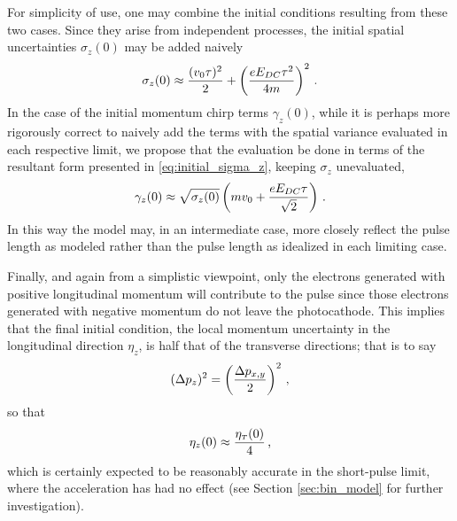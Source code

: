 For simplicity of use, one may combine the initial conditions resulting from these two cases.
Since they arise from independent processes, the initial spatial uncertainties $\sigma_{ z } ( 0 )$ may be added naively 
\begin{equation} \label{eq:initial_sigma_z}
  \sigma_{ z } ( 0 ) \approx \frac{ ( v_{ 0 } \tau )^{ 2 } }{ 2 } + \left ( \frac{ e E_{ DC } \tau^{ 2 } }{ 4 m } \right )^{ 2 } \, \text{.}
\end{equation}
In the case of the initial momentum chirp terms $\gamma_{ z } ( 0 )$, while it is perhaps more rigorously correct to naively add  the terms with the spatial variance evaluated in each respective limit, we propose that the evaluation be done in terms of the resultant form presented in \ref{eq:initial_sigma_z}, keeping $\sigma_{z}$ unevaluated, 
\begin{equation}
  \gamma_{ z } ( 0 ) \approx \sqrt{ \sigma_{ z } ( 0 ) } \left ( m v_{ 0 } + \frac{ e E_{DC} \tau }{ \sqrt{ 2 } } \right ) \, \text{.}
\end{equation}
In this way the model may, in an intermediate case, more closely reflect the pulse length as modeled rather than the pulse length as idealized in each limiting case.

Finally, and again from a simplistic viewpoint, only the electrons generated with positive longitudinal momentum will contribute to the pulse since those electrons generated with negative momentum do not leave the photocathode.
This implies that the final initial condition, the local momentum uncertainty in the longitudinal direction $\eta_z$, is half that of the transverse directions; that is to say
\begin{equation}
  ( \Delta p_{ z } )^{2} = \left ( \frac{\Delta p_{ x , y }}{ 2 } \right )^{2} \, \text{,}
\end{equation}
so that
\begin{equation}
  \eta_{ z } ( 0 ) \approx \frac{ \eta_{ {\scriptscriptstyle T} } ( 0 )}{ 4 } \, \text{,}
\end{equation}
which is certainly expected to be reasonably accurate in the short-pulse limit, where the acceleration has had no effect (see Section \ref{sec:bin_model} for further investigation).

